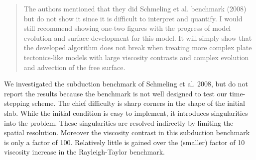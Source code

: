 \documentclass[a4paper,12pt]{article}
\begin{document}
\begin{quotation}
The authors mentioned that they did Schmeling et al. benchmark (2008) but do not show it since it is difficult to interpret and quantify. I would still recommend showing one-two figures with the progress of model evolution and surface development for this model. It will simply show that the developed algorithm does not break when treating more complex plate tectonics-like models with large viscosity contrasts and complex evolution and advection of the free surface.
\end{quotation}

We investigated the subduction benchmark of Schmeling et al. 2008, but do not report
the results because the benchmark is not well designed to test our time-stepping scheme.
The chief difficulty is sharp corners in the shape of the initial slab. While the initial condition
is easy to implement, it introduces singularities into the problem. These singularities are
resolved indirectly by limiting the spatial resolution. Moreover the viscosity contrast in this
subduction benchmark is only a factor of 100. Relatively little is gained over the (smaller)
factor of 10 viscosity increase in the Rayleigh-Taylor benchmark.
\end{document}

